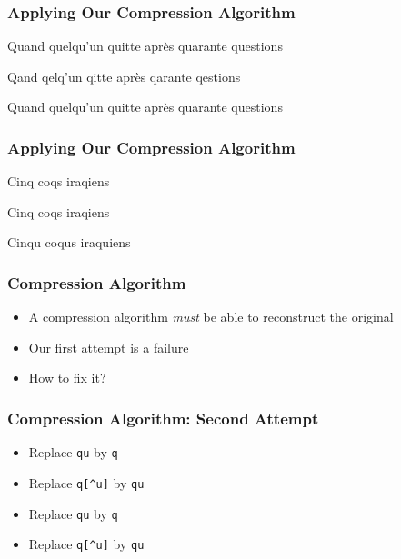 \begin{frame}
  \frametitle{Applying Our Compression Algorithm}
  \begin{center}
    Quand quelqu'un quitte apr\`es quarante questions
  \end{center}
  \vskip5mm
  \begin{center}
    Qand qelq'un qitte apr\`es qarante qestions
  \end{center}
  \vskip5mm
  \begin{center}
    Quand quelqu'un quitte apr\`es quarante questions
  \end{center}
  \begin{center}
  \end{center}
\end{frame}

\begin{frame}
  \frametitle{Applying Our Compression Algorithm}
  \begin{center}
    Cinq coqs iraqiens
  \end{center}
  \vskip5mm
  \begin{center}
    Cinq coqs iraqiens
  \end{center}
  \vskip5mm
  \begin{center}
    Cinqu coqus iraquiens
  \end{center}
  \begin{center}
  \end{center}
\end{frame}

\begin{frame}
  \frametitle{Compression Algorithm}
  \begin{itemize}
    \item A compression algorithm \emph{must} be able to
          reconstruct the original
    \item Our first attempt is a failure
    \item How to fix it?
  \end{itemize}
\end{frame}

\begin{frame}
  \frametitle{Compression Algorithm: Second Attempt}
  \begin{itemize}
    \item Replace {\tt qu} by {\tt q}
    \item Replace {\tt q[\^{}u]} by {\tt qu}
  \end{itemize}
  \vskip5mm
  \begin{itemize}
    \item Replace {\tt qu} by {\tt q}
    \item Replace {\tt q[\^{}u]} by {\tt qu}
  \end{itemize}
\end{frame}

